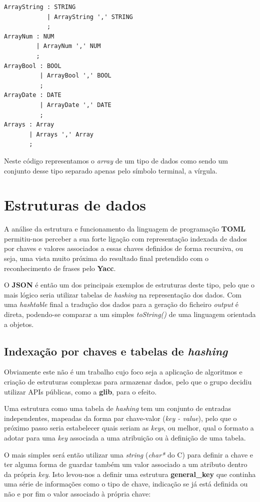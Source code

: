 \documentclass[a4paper,12pt]{report}
\begin{document}
\begin{verbatim}
ArrayString : STRING
            | ArrayString ',' STRING
            ;
ArrayNum : NUM
         | ArrayNum ',' NUM
         ;
ArrayBool : BOOL
          | ArrayBool ',' BOOL
          ;
ArrayDate : DATE
          | ArrayDate ',' DATE
          ;
Arrays : Array
       | Arrays ',' Array
       ;
\end{verbatim}

Neste código representamos o \textit{array} de um tipo de dados como sendo um conjunto desse tipo separado apenas pelo símbolo terminal, a vírgula.

\vspace{25cm}


\section{Estruturas de dados}

A análise da estrutura e funcionamento da linguagem de programação \textbf{TOML} permitiu-nos perceber a sua forte ligação com representação indexada de dados por chaves e valores associados a essas chaves definidos de forma recursiva, ou seja, uma vista muito próxima do resultado final pretendido com o reconhecimento de frases pelo \textbf{Yacc}.
\par
O \textbf{JSON} é então um dos principais exemplos de estruturas deste tipo,  pelo que o mais lógico seria utilizar tabelas de \textit{hashing} na representação dos dados. Com uma \textit{hashtable} final a tradução dos dados para a geração do ficheiro \textit{output} é direta, podendo-se comparar a um simples \textit{toString()} de uma linguagem orientada a objetos. \par

\subsection{Indexação por chaves e tabelas de \textit{hashing}}

Obviamente este não é um trabalho cujo foco seja a aplicação de algoritmos e criação de estruturas complexas para armazenar dados, pelo que o grupo decidiu utilizar APIs públicas, como a \textbf{glib}, para o efeito.
\par
Uma estrutura como uma tabela de \textit{hashing} tem um conjunto de entradas independentes, mapeadas da forma par chave-valor (\textit{key - value}), pelo que o próximo passo seria estabelecer quais seriam as \textit{keys}, ou melhor, qual o formato a adotar para uma \textit{key} associada a uma atribuição ou à definição de uma tabela.
\par
O mais simples será então utilizar uma \textit{string} (\textit{char*} do C) para definir a chave e ter alguma forma de guardar também um valor associado a um atributo dentro da própria \textit{key}. Isto levou-nos a definir uma estrutura \textbf{general\_key} que continha uma série de informações como o tipo de chave, indicação se já está definida ou não e por fim o valor associado à própria chave:
\end{document}
